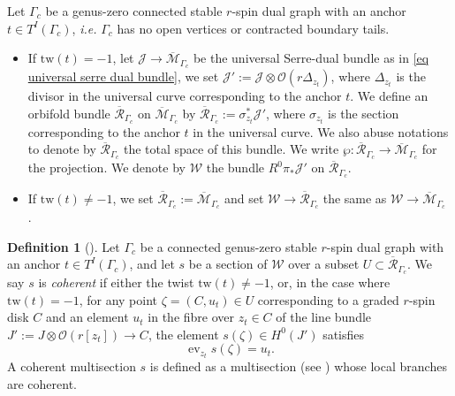 \documentclass[11pt]{amsart}
\theoremstyle{definition}
\newtheorem{definition}[dummy]{Definition}
\theoremstyle{remark}
\newcommand{\tw}{\text{tw}}
\newcommand{\<}{\left<}
\renewcommand{\>}{\right>}
\numberwithin{equation}{section}
\def\Mbar{{\overline{\mathcal M}}}
\begin{document}
  Let $ \Gamma_c$ be a genus-zero connected stable $r$-spin dual graph with an anchor $t\in T^I(\Gamma_c)$, \textit{i.e.} $ \Gamma_c$  has no open vertices or contracted boundary tails.
  \begin{itemize}
      \item If $\tw(t)=-1$, let $\mathcal J\to \Mbar_{ \Gamma_c}$ be the universal Serre-dual bundle as %
in \eqref{eq universal serre dual bundle}, we set %
$\mathcal{J}' := \mathcal{J} \otimes \mathcal O \left( r\Delta_{z_t}\right)$, where $\Delta_{z_t}$ is the divisor in the universal curve corresponding to the anchor $t$.
    We define an orbifold bundle ${\overline{\mathcal{R}}}_{\Gamma_c}$ on $\Mbar_{ \Gamma_c}$ by
    ${\overline{\mathcal{R}}}_{ \Gamma_c}:= \sigma_{z_t}^*\mathcal{J}'$,
     where $\sigma_{z_t}$ is the section corresponding to the  anchor $t$ in the universal curve. We also abuse notations to denote by ${\overline{\mathcal{R}}}_{ \Gamma_c}$ the total space of this bundle. We write
$\wp: {\overline{\mathcal{R}}}_{ \Gamma_c} \to \Mbar_{ \Gamma_c}$ for the projection.     We denote by ${\mathcal{W}}$ the  bundle $R^0\pi_*\mathcal{J}'$ on ${\overline{\mathcal{R}}}_{\Gamma_c}$.
\item If $\tw(t)\ne -1$, we set ${\overline{\mathcal{R}}}_{ \Gamma_c}:=\Mbar_{\Gamma_c}$ and set $\mathcal W\to {\overline{\mathcal{R}}}_{ \Gamma_c}$ the same as $\mathcal W\to \Mbar_{\Gamma_c}$%
.
  \end{itemize}
  

\begin{definition}[{\cite[Definition 4.2]{BCT2}}]
\label{def coherent}
 Let %
$ \Gamma_c$ be a connected genus-zero stable $r$-spin dual graph with an anchor $t\in T^I(\Gamma_c)$, and let $s$ be a section of $\mathcal{W}$ over a subset $U\subset{\overline{\mathcal{R}}}_{\Gamma_c}$. We say $s$ is \textit{coherent} if either the twist %
$\tw(t)\ne -1$, or, %
in the case where $\tw(t)= -1$, for any point $\zeta=(C, u_t) \in U$  corresponding to a graded $r$-spin disk $C$ and an element $u_t$ in the fibre over $z_t\in C$ of the line bundle $J':=J\otimes \mathcal O(r[z_t])\to C$, the element $s(\zeta) \in H^0(J')$ satisfies
$$\operatorname{ev}_{z_t}s(\zeta) = u_t.$$ A coherent multisection $s$ is defined as a multisection  %
(see \cite[Appendix A]{BCT2}) whose %
local branches are coherent. 

\end{definition}
\end{document}
